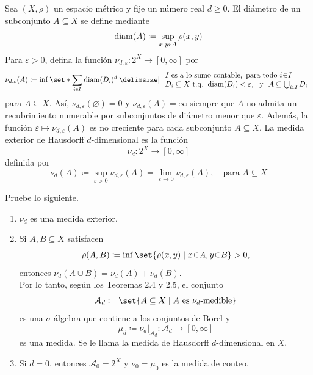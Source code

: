 
\setcounter{neje}{34}
\begin{nejer}
Sea $(X, \rho)$ un espacio métrico y fije un número real $d \ge 0$. El diámetro de un subconjunto $A \subseteq X$ se define mediante
$$
\diam(A) \coloneq \sup_{x, y \en A} \rho(x, y)
$$
Para $\varepsilon > 0$, defina la función
$
\nu_{d, \varepsilon} \colon 2^X \to [0, \infty]
$
por
$$
\nu_{d, \varepsilon}(A) \coloneq%
\inf \set*{%
    \sum_{i \en I} \diam(D_i)^d%
    \given%
    \begin{array}{l} I \text{ es a lo sumo contable,}\,\ \text{para todo } i \en I\\ D_i \subseteq X \text{ t.q. } \diam(D_i) < \varepsilon, \ \text{ y } \ A \subseteq \bigcup_{i \en I} D_i \end{array} 
}
$$
para $A \subseteq X$. Así, $\nu_{d, \varepsilon}(\varnothing) = 0$ y $\nu_{d, \varepsilon}(A) = \infty$ siempre que $A$ no admita un recubrimiento numerable por subconjuntos de diámetro menor que $\varepsilon$. Además, la función $\varepsilon \mapsto \nu_{d, \varepsilon}(A)$ es no creciente para cada subconjunto $A \subseteq X$. La medida exterior de Hausdorff $d$-dimensional es la función
$$
\nu_d \colon 2^X \to [0, \infty]
$$
definida por
$$
\nu_d(A) \coloneq \sup_{\varepsilon > 0} \nu_{d, \varepsilon}(A) = \lim_{\varepsilon \to 0} \nu_{d, \varepsilon}(A),
\quad\text{para } A \subseteq X
$$


Pruebe lo siguiente.
\begin{enumerate}[label = (\roman*), leftmargin=1.5em]
    \item $\nu_d$ es una medida exterior.
    
    \item Si $A, B \subseteq X$ satisfacen
    $$
    \rho(A, B) \coloneq \inf\set{\rho(x, y) \mid x \en A, y \en B} > 0,
    $$
    entonces $\nu_d(A \cup B) = \nu_d(A) + \nu_d(B).$\\
    Por lo tanto, según los Teoremas 2.4 y 2.5, el conjunto
    $$
    \mathcal{A}_d \coloneq \set{A \subseteq X \mid A \text{ es } \nu_d\text{-medible}}
    $$
    es una $\sigma$-álgebra que contiene a los conjuntos de Borel y
    $$
    \mu_d \coloneq \nu_d|_{\mathcal{A}_d} \colon \mathcal{A}_d \to [0, \infty]
    $$
    es una medida. Se le llama la medida de Hausdorff $d$-dimensional en $X$.
    
    \item Si $d = 0$, entonces $\mathcal{A}_0 = 2^X$ y $\nu_0 = \mu_0$ es la medida de conteo.
    

\end{enumerate}
\end{nejer}
